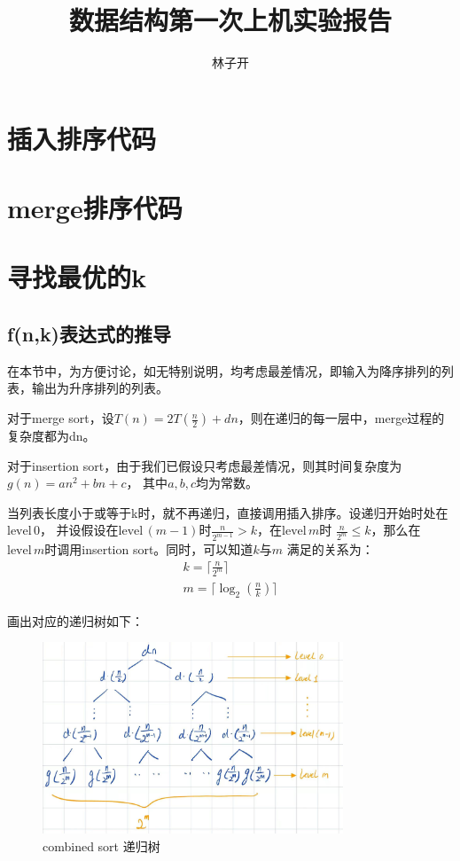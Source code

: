 \documentclass{article}
\title{数据结构第一次上机实验报告}
\author{林子开}
\begin{document}
	\maketitle
	\tableofcontents
\section{插入排序代码}
    

\section{merge排序代码}
    

\section{寻找最优的k}

\subsection{f(n,k)表达式的推导}
	在本节中，为方便讨论，如无特别说明，均考虑最差情况，即输入为降序排列的列表，输出为升序排列的列表。

	对于merge sort，设$T(n) = 2T(\frac{n}{2}) + dn$，则在递归的每一层中，merge过程的复杂度都为dn。

	对于insertion sort，由于我们已假设只考虑最差情况，则其时间复杂度为$g(n)=an^2+bn+c$，
	其中$a,b,c$均为常数。
	
	当列表长度小于或等于k时，就不再递归，直接调用插入排序。设递归开始时处在$\text{level}\,0$，
	并设假设在$\text{level}\,(m-1)$时$\frac{n}{2^{m-1}}>k$，在$\text{level}\,m$时
	$\frac{n}{2^{m}}\le k$，那么在$\text{level}\,m$时调用insertion sort。同时，可以知道$k$与$m$	
	满足的关系为：
	\begin{align} 
		k = \lceil \frac{n}{2^m} \rceil  \label{km1} \\
		m = \lceil \log_2(\frac{n}{k})  \rceil \label{km2}
	\end{align}
	
	画出对应的递归树如下：
	\begin{figure}[H]
		\centering  %
		\includegraphics[width=0.8\textwidth]{递归树}
		\caption{combined sort 递归树}
	\end{figure}
\end{document}
